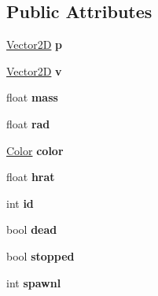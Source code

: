 \subsection*{Public Attributes}
\begin{DoxyCompactItemize}
\item 
\hypertarget{class_object_a99f124fb1348ce54003a170411919913}{\hyperlink{class_vector2_d}{Vector2\-D} {\bfseries p}}\label{class_object_a99f124fb1348ce54003a170411919913}

\item 
\hypertarget{class_object_a08dada56e9bde8cbda508c7fb1bae00b}{\hyperlink{class_vector2_d}{Vector2\-D} {\bfseries v}}\label{class_object_a08dada56e9bde8cbda508c7fb1bae00b}

\item 
\hypertarget{class_object_a60866179af7cb2aad410ea01de546e4e}{float {\bfseries mass}}\label{class_object_a60866179af7cb2aad410ea01de546e4e}

\item 
\hypertarget{class_object_a78dfb0ff4a8ea85a6de266cc1ebff93a}{float {\bfseries rad}}\label{class_object_a78dfb0ff4a8ea85a6de266cc1ebff93a}

\item 
\hypertarget{class_object_a3ed85d6e0b0b62ff2501d421cb55c5e9}{\hyperlink{class_color}{Color} {\bfseries color}}\label{class_object_a3ed85d6e0b0b62ff2501d421cb55c5e9}

\item 
\hypertarget{class_object_acdb5ddc034cf35c452c2f5cfcbf8c0e4}{float {\bfseries hrat}}\label{class_object_acdb5ddc034cf35c452c2f5cfcbf8c0e4}

\item 
\hypertarget{class_object_aa7caf12457afb8b79152cfaf0158c827}{int {\bfseries id}}\label{class_object_aa7caf12457afb8b79152cfaf0158c827}

\item 
\hypertarget{class_object_a3b1f27788974d367db00ea4e87873d1d}{bool {\bfseries dead}}\label{class_object_a3b1f27788974d367db00ea4e87873d1d}

\item 
\hypertarget{class_object_a8ef3a022a1544f35c79d79b3f61fcbb1}{bool {\bfseries stopped}}\label{class_object_a8ef3a022a1544f35c79d79b3f61fcbb1}

\item 
\hypertarget{class_object_ab39618b61cf21a25135a5b08a8a51a95}{int {\bfseries spawnl}}\label{class_object_ab39618b61cf21a25135a5b08a8a51a95}


\end{DoxyCompactItemize}
